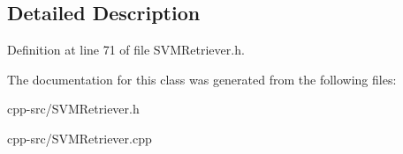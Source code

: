 \subsection{Detailed Description}


Definition at line 71 of file S\-V\-M\-Retriever.\-h.



The documentation for this class was generated from the following files\-:\begin{DoxyCompactItemize}
\item 
cpp-\/src/S\-V\-M\-Retriever.\-h\item 
cpp-\/src/S\-V\-M\-Retriever.\-cpp\end{DoxyCompactItemize}
